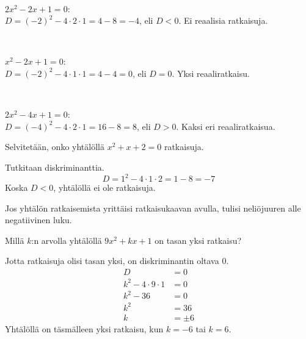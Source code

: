 \begin{esimerkki}
\ \\
\parbox{4.5cm}{
\begin{kuvaajapohja}{1}{-1}{3}{-1}{3}
\end{kuvaajapohja}
}
\parbox{6cm}{$2x^2-2x+1=0$:\\$D=(-2)^2-4 \cdot 2 \cdot 1=4-8=-4$, eli $D <0$. Ei reaalisia ratkaisuja.}
\\
\parbox{4.5cm}{
\begin{kuvaajapohja}{1}{-1}{3}{-1}{3}
\end{kuvaajapohja}
}
\parbox{6cm}{$x^2-2x+1=0$:\\$D=(-2)^2-4 \cdot 1 \cdot 1=4-4=0$, eli $D = 0$. Yksi reaaliratkaisu.}
\\
\parbox{4.5cm}{
\begin{kuvaajapohja}{1}{-1}{3}{-2}{2}
\end{kuvaajapohja}
}
\parbox{6cm}{$2x^2-4x+1=0$:\\$D=(-4)^2-4 \cdot 2 \cdot 1=16-8=8$, eli $D > 0$. Kaksi eri reaaliratkaisua.}
\end{esimerkki}

\begin{esimerkki}
Selvitetään, onko yhtälöllä $x^2+x+2=0$ ratkaisuja.

Tutkitaan diskriminanttia.
\[D=1^2-4\cdot 1 \cdot 2 = 1-8 = -7\]
Koska $D<0$, yhtälöllä ei ole ratkaisuja.

Jos yhtälön ratkaisemista yrittäisi ratkaisukaavan avulla, tulisi neliöjuuren alle negatiivinen luku.
\end{esimerkki}

\begin{esimerkki} %
Millä $k$:n arvolla yhtälöllä $9x^2+kx+1$ on tasan yksi ratkaisu?

Jotta ratkaisuja olisi tasan yksi, on diskriminantin oltava $0$.
\begin{align*}
D &= 0\\
k^2-4\cdot 9\cdot 1 &= 0\\
k^2-36 &= 0\\
k^2 &= 36\\
k &= \pm 6
\end{align*}
Yhtälöllä on täsmälleen yksi ratkaisu, kun $k=-6$ tai $k=6$.
\end{esimerkki}

